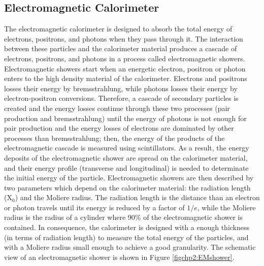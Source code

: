 



\subsection{Electromagnetic Calorimeter}
\label{subsec:ECal}


The electromagnetic calorimeter is designed to absorb the total energy 
of electrons, positrons, and photons when they pass through it. The interaction between these 
particles and the calorimeter material produces a cascade of electrons, positrons, and photons in a process 
called electromagnetic showers. Electromagnetic showers start when an energetic electron, 
positron or photon enters to the high density material of the calorimeter. Electrons and 
positrons losses their energy by bremsstrahlung, while photons 
losses their energy by electron-positron conversions. Therefore, a cascade
of secondary particles is created and the energy losses continue through 
these two processes (pair production and bremsstrahlung) until the energy of photons is not
enough for pair production and the energy losses of electrons are dominated by other processes 
than bremsstrahlung; then, the energy of the products of the electromagnetic cascade 
is measured using scintillators. As a result, the energy 
deposits of the electromagnetic shower are spread on the calorimeter material, and 
their energy profile (transverse and longitudinal) is needed to determinate 
the initial energy of the particle. Electromagnetic showers are then described by two parameters which depend
on the calorimeter material: the radiation length (X$_{0}$) and the Moliere radius. The radiation length is 
the distance than an electron or photon travels until its energy is reduced by a factor 
of $1/e$, while the Moliere radius is the radius of a cylinder where 90$\%$ of 
the electromagnetic shower is contained. In consequence, the calorimeter 
is designed with a enough thickness (in terms of radiation length) to measure the total
energy of the particles, and with a Moliere radius small enough to achieve a good granularity. 
The schematic view of an electromagnetic shower is shown in Figure \ref{figchp2:EMshower}. 

